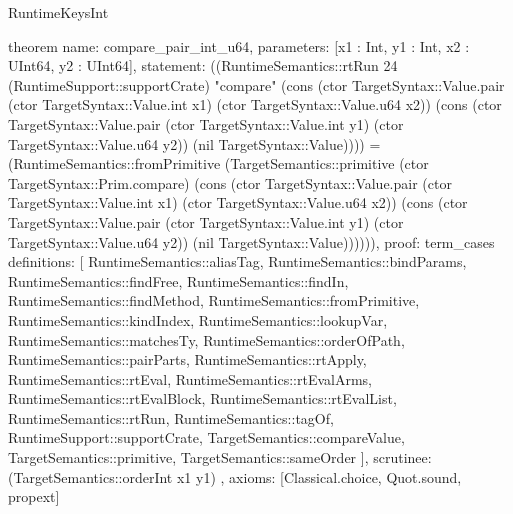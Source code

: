 \begin{lexlean}{RuntimeKeysInt}
\begin{semanticmodule}
theorem{
  name: compare_pair_int_u64,
  parameters: [x1 : Int, y1 : Int, x2 : UInt64, y2 : UInt64],
  statement: ((RuntimeSemantics::rtRun 24 (RuntimeSupport::supportCrate) "compare" (cons (ctor TargetSyntax::Value.pair (ctor TargetSyntax::Value.int x1) (ctor TargetSyntax::Value.u64 x2)) (cons (ctor TargetSyntax::Value.pair (ctor TargetSyntax::Value.int y1) (ctor TargetSyntax::Value.u64 y2)) (nil TargetSyntax::Value)))) = (RuntimeSemantics::fromPrimitive (TargetSemantics::primitive (ctor TargetSyntax::Prim.compare) (cons (ctor TargetSyntax::Value.pair (ctor TargetSyntax::Value.int x1) (ctor TargetSyntax::Value.u64 x2)) (cons (ctor TargetSyntax::Value.pair (ctor TargetSyntax::Value.int y1) (ctor TargetSyntax::Value.u64 y2)) (nil TargetSyntax::Value)))))),
  proof: term_cases{
    definitions: [
      RuntimeSemantics::aliasTag,
      RuntimeSemantics::bindParams,
      RuntimeSemantics::findFree,
      RuntimeSemantics::findIn,
      RuntimeSemantics::findMethod,
      RuntimeSemantics::fromPrimitive,
      RuntimeSemantics::kindIndex,
      RuntimeSemantics::lookupVar,
      RuntimeSemantics::matchesTy,
      RuntimeSemantics::orderOfPath,
      RuntimeSemantics::pairParts,
      RuntimeSemantics::rtApply,
      RuntimeSemantics::rtEval,
      RuntimeSemantics::rtEvalArms,
      RuntimeSemantics::rtEvalBlock,
      RuntimeSemantics::rtEvalList,
      RuntimeSemantics::rtRun,
      RuntimeSemantics::tagOf,
      RuntimeSupport::supportCrate,
      TargetSemantics::compareValue,
      TargetSemantics::primitive,
      TargetSemantics::sameOrder
    ],
    scrutinee: (TargetSemantics::orderInt x1 y1)
  },
  axioms: [Classical.choice, Quot.sound, propext]
}


\end{semanticmodule}
\end{lexlean}
